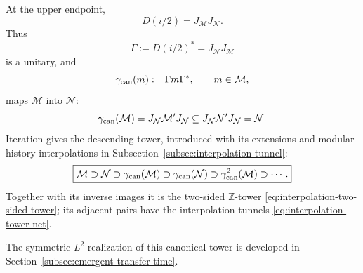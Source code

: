 \documentclass[a4paper,11pt]{article}
\theoremstyle{definition}
\newcommand{\mN}{\mathcal{N}}
\newcommand{\mM}{\mathcal{M}}
\begin{document}
At the upper endpoint,
\begin{equation}
    \boxed{
    D(i/2)=J_{\mM}J_{\mN} .
    }
    \label{eq:D-half-common}
\end{equation}
Thus
\begin{equation}
    \Gamma:=D(i/2)^*=J_{\mN}J_{\mM}
\end{equation}
is a unitary, and
\begin{equation}
    \gamma_{\rm can}(m)
    :=
    \Gamma m\Gamma^*,
    \qquad
    m\in\mM,
    \label{eq:canonical-endomorphism-common}
\end{equation}
maps $\mM$ into $\mN$:
\begin{equation}
    \gamma_{\rm can}(\mM)
    =
    J_{\mN}\mM'J_{\mN}
    \subseteq
    J_{\mN}\mN'J_{\mN}
    =
    \mN .
\end{equation}
Iteration gives the descending tower, introduced with its extensions
and modular-history interpolations in
Subsection~\ref{subsec:interpolation-tunnel}:
\begin{equation}
    \boxed{
    \mM
    \supset
    \mN
    \supset
    \gamma_{\rm can}(\mM)
    \supset
    \gamma_{\rm can}(\mN)
    \supset
    \gamma_{\rm can}^2(\mM)
    \supset\cdots .
    }
    \label{eq:canonical-discrete-tower}
\end{equation}
Together with its inverse images it is the two-sided $\mathbb Z$-tower
\eqref{eq:interpolation-two-sided-tower}; its adjacent pairs have the
interpolation tunnels \eqref{eq:interpolation-tower-net}.

The symmetric $L^2$ realization of this canonical tower is developed in
Section~\ref{subsec:emergent-transfer-time}.
\end{document}
